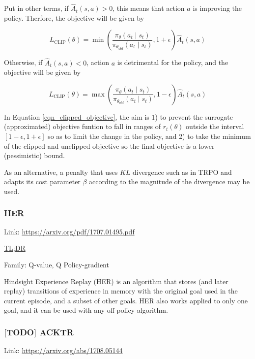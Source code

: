 \documentclass[12pt, english]{article}
\begin{document}
Put in other terms, if $\hat{A}_t(s,a) > 0$, this means that action $a$ is improving the policy. Therfore, the objective will be given by

\begin{equation*}
  L_{\text{CLIP}} (\theta) = \min (\frac{\pi_\theta(a_t \mid s_t)}{\pi_{\theta_{old}} (a_t \mid s_t)}, 1+\epsilon) \hat{A}_t(s,a)
\end{equation*}

Otherwise, if $\hat{A}_t(s,a) < 0$, action $a$ is detrimental for the policy, and the objective will be given by

\begin{equation*}
  L_{\text{CLIP}} (\theta) = \max (\frac{\pi_\theta(a_t \mid s_t)}{\pi_{\theta_{old}} (a_t \mid s_t)}, 1-\epsilon) \hat{A}_t(s,a)
\end{equation*}

In Equation \ref{eqn_clipped_objective}, the aim is 1) to prevent the surrogate (approximated) objective funtion to fall in ranges of $r_t(\theta)$ outside the interval $[1-\epsilon, 1+\epsilon]$ so as to limit the change in the policy, and 2) to take the minimum of the clipped and unclipped objective so the final objective is a lower (pessimistic) bound.

As an alternative, a penalty that uses $KL$ divergence such as in TRPO and adapts its cost parameter $\beta$ according to the magnitude of the divergence may be used.

\subsubsection{HER}

Link: \url{https://arxiv.org/pdf/1707.01495.pdf}

\underline{TL;DR}

Family: Q-value, Q Policy-gradient

Hindsight Experience Replay (HER) is an algorithm that stores (and later replay) transitions of experience in memory with the original goal used in the current episode, and a subset of other goals. HER also works applied to only one goal, and it can be used with any off-policy algorithm.

\subsubsection{[TODO] ACKTR}

Link: \url{https://arxiv.org/abs/1708.05144}
\end{document}
